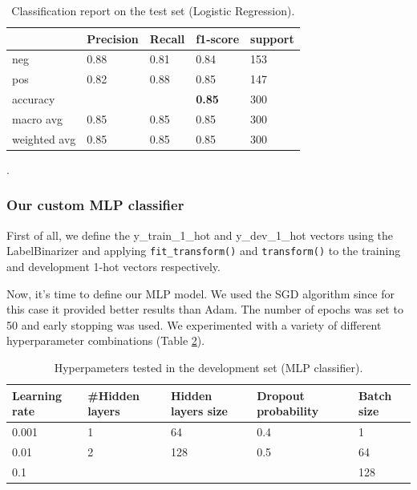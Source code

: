 \documentclass[10pt, a4paper]{article}
\begin{document}
	\begin{table}
		\begin{tabular}{|l|l|l|l|l|}
			\hline
			\cellcolor{blue!25}\textbf{} & \cellcolor{blue!25}\textbf{Precision} &
			\cellcolor{blue!25}\textbf{Recall}  &
			\cellcolor{blue!25}\textbf{f1-score}  &
			\cellcolor{blue!25}\textbf{support}\\
			\hline
			neg & 0.88 & 0.81 & 0.84 & 153 \\\hline
			pos & 0.82  & 0.88 & 0.85 & 147 \\\hline
			accuracy & & & \textbf{0.85} & 300 \\\hline
			macro avg & 0.85 & 0.85 & 0.85 & 300 \\\hline
			weighted avg & 0.85 & 0.85 & 0.85 & 300 \\\hline
			
		\end{tabular}
		\centering
		\caption{Classification report on the test set (Logistic Regression).}
		\label{tab::ex-1-report-test-lr}
	\end{table}
	 .
	
	
	
	\subsubsection{Our custom MLP classifier}
	
	First of all, we define the y\_train\_1\_hot and y\_dev\_1\_hot vectors using the LabelBinarizer and applying \texttt{fit\_transform()} and \texttt{transform()} to the training and development 1-hot vectors respectively.
	
	Now, it’s time to define our MLP model. We used the SGD algorithm since for this case it provided better results than Adam. The number of epochs was set to 50 and early stopping was used. We experimented with a variety of different hyperparameter combinations (Table \ref{tab::ex-9-hyper}).
	
	
	
	
	\begin{table}
		\centering
		\begin{tabular}{|l|l|l|l|l|}
			\hline
			\rowcolor{blue!25}\textbf{Learning rate} & \cellcolor{blue!25}\textbf{\#Hidden layers} & \cellcolor{blue!25}\textbf{Hidden layers size} & \cellcolor{blue!25}\textbf{Dropout probability} & \cellcolor{blue!25}\textbf{Batch size}\\
			\hline
			0.001 & 1 & 64 & 0.4 & 1\\
			\hline
			0.01 & 2 & 128 & 0.5 & 64\\
			\hline
			0.1 &  &  & & 128 \\
			
			
			
			\hline
		\end{tabular}
		\caption{Hyperpameters tested in the development set (MLP classifier).}
		\label{tab::ex-9-hyper}
	\end{table}
	
\end{document}

